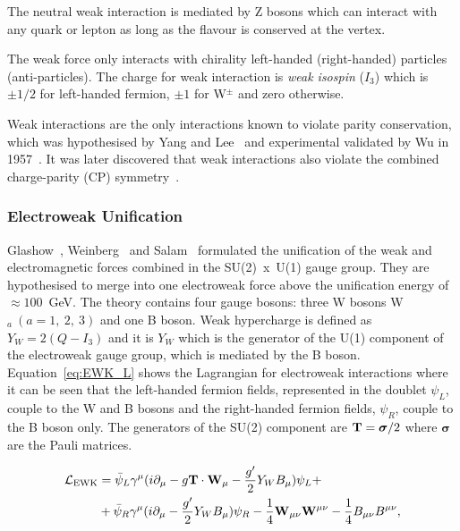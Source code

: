 The neutral weak interaction is mediated by Z bosons which can interact with any quark or lepton as long as the flavour is conserved at the vertex.

The weak force only interacts with chirality left-handed (right-handed) particles (anti-particles).
The charge for weak interaction is \emph{weak isospin} ($I_{3}$) which is $\pm1/2$ for left-handed fermion, $\pm1$ for W$^{\pm}$ and zero otherwise.

Weak interactions are the only interactions known to violate parity conservation, which was hypothesised by Yang and Lee~\cite{PhysRev.104.254} and experimental validated by Wu in 1957~\cite{PhysRev.105.1413}. It was later discovered that weak interactions also violate the combined charge-parity (CP) symmetry~\cite{Cronin2012,PhysRevLett.13.138}.

\subsubsection{Electroweak Unification}

Glashow~\cite{Glashow:1961tr}, Weinberg~\cite{PhysRevLett.19.1264} and Salam~\cite{Salam:1968rm} formulated the unification of the weak and electromagnetic forces combined in the SU(2)~x~U(1) gauge group. They are hypothesised to merge into one electroweak force above the unification energy of $\approx 100$~GeV. The theory contains four gauge bosons: three W bosons W$_{a}~(a=1,~2,~3)$ and one B boson. Weak hypercharge is defined as $Y_{W} = 2(Q-I_{3})$ and it is $Y_W$ which is the generator of the U(1) component of the electroweak gauge group, which is mediated by the B boson. Equation~\ref{eq:EWK_L} shows the Lagrangian for electroweak interactions where it can be seen that the left-handed fermion fields, represented in the doublet $\psi_{L}$, couple to the W and B bosons and the right-handed fermion fields, $\psi_{R}$, couple to the B boson only. The generators of the SU(2) component are ${\bf T} = \boldsymbol{\sigma}/2$ where $\boldsymbol{\sigma}$ are the Pauli matrices.

\begin{equation}
\label{eq:EWK_L}
\begin{split}
\mathcal{L}_\textrm{EWK} & = \bar{\psi}_L \gamma^\mu ( i\partial_\mu  - g \mathbf{T} \cdot \mathbf{W}_\mu - \frac{g'}{2} Y_{W}
B_\mu) \psi_L + \\ & + \bar{\psi}_R \gamma^\mu (i \partial_\mu - \frac{g'}{2} Y_{W} B_\mu) \psi_R -
\frac{1}{4}\mathbf{W}_{\mu\nu} \mathbf{W}^{\mu\nu} -\frac{1}{4}B_{\mu\nu} B^{\mu\nu},
\end{split}
\end{equation}

